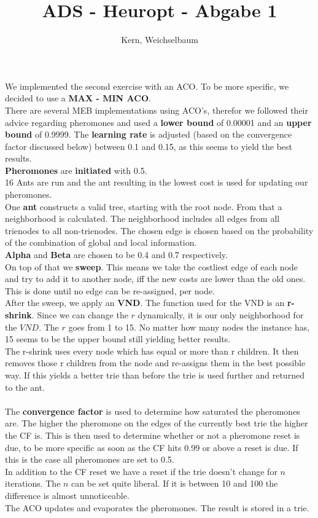 \documentclass[12pt]{article}
\title{ADS - Heuropt - Abgabe 1}
\author{Kern, Weichselbaum}
\begin{document}
	
\maketitle

We implemented the second exercise with an ACO. To be more specific, we decided to use a \textbf{MAX - MIN ACO}.\\
There are several MEB implementations using ACO's, therefor we followed their advice regarding pheromones and used a \textbf{lower bound} of 0.00001 and an \textbf{upper bound} of 0.9999. The \textbf{learning rate} is adjusted (based on the convergence factor discussed below) between 0.1 and 0.15, as this seems to yield the best results.\\
\textbf{Pheromones} are \textbf{initiated} with 0.5.
\\
16 Ants are run and the ant resulting in the lowest cost is used for updating our pheromones. \\
One \textbf{ant} constructs a valid tree, starting with the root node. From that a neighborhood is calculated. The neighborhood includes all edges from all trienodes to all non-trienodes. The chosen edge is chosen based on the probability of the combination of global and local information.\\
\textbf{Alpha} and \textbf{Beta} are chosen to be 0.4 and 0.7 respectively.\\
On top of that we \textbf{sweep}. This means we take the costliest edge of each node and try to add it to another node, iff the new costs are lower than the old ones. This is done until no edge can be re-assigned, per node.\\
After the sweep, we apply an \textbf{VND}. The function used for the VND is an \textbf{r-shrink}. Since we can change the $r$ dynamically, it is our only neighborhood for the $VND$. The $r$ goes from 1 to 15. No matter how many nodes the instance has, 15 seems to be the upper bound still yielding better results.\\
The r-shrink uses every node which has equal or more than r children. It then removes those r children from the node and re-assigns them in the best possible way. If this yields a better trie than before the trie is used further and returned to the ant.\\
\\
The \textbf{convergence factor} is used to determine how saturated the pheromones are. The higher the pheromone on the edges of the currently best trie the higher the CF is. This is then used to determine whether or not a pheromone reset is due, to be more specific as soon as the CF hits 0.99 or above a reset is due. If this is the case all pheromones are set to 0.5.\\
In addition to the CF reset we have a reset if the trie doesn't change for $n$ iterations. The $n$ can be set quite liberal. If it is between 10 and 100 the difference is almost unnoticeable.
\\
The ACO updates and evaporates the pheromones. The result is stored in a trie.
\end{document}
